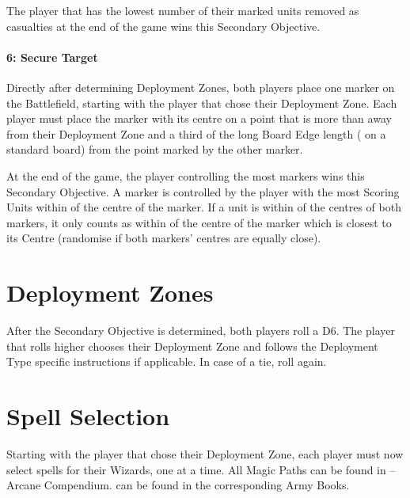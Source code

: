 The player that has the lowest number of their marked units removed as casualties at the end of the game wins this Secondary Objective.

\paragraph{6: Secure Target}

\newline
Directly after determining Deployment Zones, both players place one marker on the Battlefield, starting with the player that chose their Deployment Zone. Each player must place the marker with its centre on a point that is more than  away from their Deployment Zone and a third of the long Board Edge length ( on a standard board) from the point marked by the other marker.

At the end of the game, the player controlling the most markers wins this Secondary Objective. A marker is controlled by the player with the most Scoring Units within  of the centre of the marker. If a unit is within  of the centres of both markers, it only counts as within  of the centre of the marker which is closest to its Centre (randomise if both markers' centres are equally close).



\section{Deployment Zones}
\label{deployment_zones}

After the Secondary Objective is determined, both players roll a D6. The player that rolls higher chooses their Deployment Zone and follows the Deployment Type specific instructions if applicable. In case of a tie, roll again.

\section{Spell Selection}
\label{spell_selection}

Starting with the player that chose their Deployment Zone, each player must now select spells for their Wizards, one at a time. All Magic Paths can be found in \nameofthegame{} -- Arcane Compendium. \hereditaryspells{} can be found in the corresponding Army Books.


